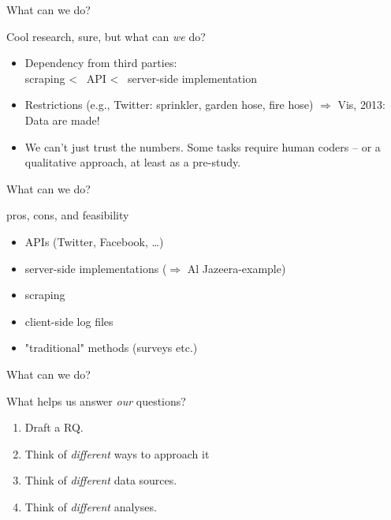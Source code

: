 \documentclass{beamer}
\begin{document}
\begin{frame}{What can we do?}
\begin{block}{Cool research, sure, but what can \emph{we} do?}
\begin{itemize}
\item Dependency from third parties: \\ scraping \textless ~ API \textless ~ server-side implementation 
\item Restrictions (e.g., Twitter: sprinkler, garden hose, fire hose) $\Rightarrow$ Vis, 2013: Data are made!
\item We can't just trust the numbers. Some tasks require human coders -- or a qualitative approach, at least as a pre-study.
\end{itemize}
\end{block}
\end{frame}


\begin{frame}{What can we do?}
\begin{block}{pros, cons, and feasibility}
\begin{itemize}
\item APIs (Twitter, Facebook, \dots)
\item server-side implementations ($\Rightarrow$ Al Jazeera-example)
\item scraping
\item client-side log files
\item "traditional" methods (surveys etc.)
\end{itemize}
\end{block}
\end{frame}

\begin{frame}{What can we do?}
\begin{block}{What helps us answer \emph{our} questions?}
\begin{enumerate}
\item Draft a RQ.
\item Think of \emph{different} ways to approach it
\item Think of \emph{different} data sources.
\item Think of \emph{different} analyses.
\end{enumerate}
\end{block}
\end{frame}
\end{document}
